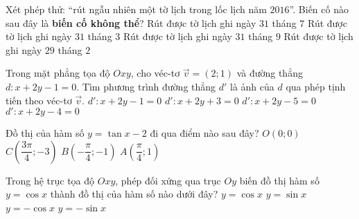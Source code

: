 \begin{ex}%
	Xét phép thử: “rút ngẫu nhiên một tờ lịch trong lốc lịch năm $2016$”. Biến cố nào sau đây là \textbf{biến cố không thể}?
	\choice
	{Rút được tờ lịch ghi ngày $31$ tháng $7$}
	{Rút được tờ lịch ghi ngày $31$ tháng $3$}
	{\True Rút được tờ lịch ghi ngày $31$ tháng $9$}
	{Rút được tờ lịch ghi ngày $29$ tháng $2$}
\end{ex}
\begin{ex}%
	Trong mặt phẳng tọa độ $Oxy$, cho véc-tơ $\overrightarrow{v}=(2;1)$ và đường thẳng $d:x+2y-1=0$. Tìm phương trình đường thẳng $d'$ là ảnh của $d$ qua phép tịnh tiến theo véc-tơ $\overrightarrow{v}$.
	\choice
	{$d':x+2y-1=0$}
	{$d':x+2y+3=0$}
	{\True $d':x+2y-5=0$}
	{$d':x+2y-4=0$}
\end{ex}
\begin{ex}%
	Đồ thị của hàm số $y=\tan x-2$ đi qua điểm nào sau đây?
	\choice
	{$O(0;0)$}
	{\True $C\left(\dfrac{3\pi}{4};-3\right)$}
	{$B\left(-\dfrac{\pi}{4};-1\right)$}
	{$A\left(\dfrac{\pi}{4};1\right)$}
\end{ex}
\begin{ex}%
	Trong hệ trục tọa độ $Oxy$, phép đối xứng qua trục $Oy$ biến đồ thị hàm số $y=\cos x$ thành đồ thị của hàm số nào dưới đây?
	\choice
	{\True $y=\cos x$}
	{$y=\sin x$}
	{$y=-\cos x$}
	{$y=-\sin x$}
\end{ex}
